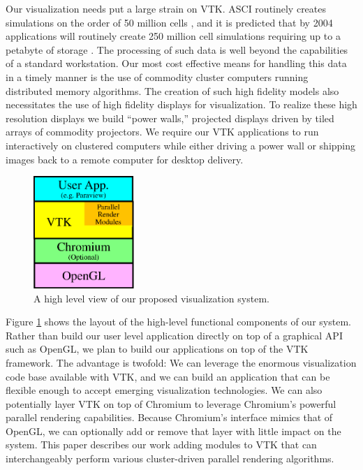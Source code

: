 \documentclass{acmsiggraph}
\begin{document}
  Our visualization needs put a large strain on VTK.  ASCI routinely
  creates simulations on the order of 50 million cells \cite{Heermann99},
  and it is predicted that by 2004 applications will routinely create 250
  million cell simulations requiring up to a petabyte of storage
  \cite{Smith98}.  The processing of such data is well beyond the
  capabilities of a standard workstation.  Our most cost effective means
  for handling this data in a timely manner is the use of commodity cluster
  computers running distributed memory algorithms.  The creation of such
  high fidelity models also necessitates the use of high fidelity displays
  for visualization.  To realize these high resolution displays we build
  ``power walls,'' projected displays driven by tiled arrays of commodity
  projectors.  We require our VTK applications to run interactively on
  clustered computers while either driving a power wall or shipping images
  back to a remote computer for desktop delivery.

  \begin{figure}
    \center
    \includegraphics[width=1.5in]{images/AppLayers}
    \caption{A high level view of our proposed visualization system.}
    \label{fig:applayers}
  \end{figure}
  Figure \ref{fig:applayers} shows the layout of the high-level functional
  components of our system.  Rather than build our user level application
  directly on top of a graphical API such as OpenGL, we plan to build our
  applications on top of the VTK framework.  The advantage is twofold: We
  can leverage the enormous visualization code base available with VTK, and
  we can build an application that can be flexible enough to accept
  emerging visualization technologies.  We can also potentially layer VTK
  on top of Chromium to leverage Chromium's powerful parallel rendering
  capabilities.  Because Chromium's interface mimics that of OpenGL, we can
  optionally add or remove that layer with little impact on the system.
  This paper describes our work adding modules to VTK that can
  interchangeably perform various cluster-driven parallel rendering
  algorithms.
\end{document}
